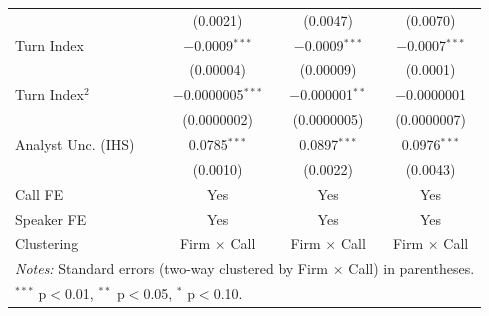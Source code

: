 \documentclass[11pt]{article}
\begin{document}
\begin{table}[htbp]
\begin{tabular}{lccc}
 & (0.0021) & (0.0047) & (0.0070) \\
Turn Index & $-$0.0009$^{***}$ & $-$0.0009$^{***}$ & $-$0.0007$^{***}$ \\
 & (0.00004) & (0.00009) & (0.0001) \\
Turn Index$^2$ & $-$0.0000005$^{***}$ & $-$0.000001$^{**}$ & $-$0.0000001 \\
 & (0.0000002) & (0.0000005) & (0.0000007) \\
Analyst Unc. (IHS) & 0.0785$^{***}$ & 0.0897$^{***}$ & 0.0976$^{***}$ \\
 & (0.0010) & (0.0022) & (0.0043) \\
\midrule
Call FE & Yes & Yes & Yes \\
Speaker FE & Yes & Yes & Yes \\
Clustering & Firm $\times$ Call & Firm $\times$ Call & Firm $\times$ Call \\
\bottomrule
\multicolumn{4}{l}{\parbox{\linewidth}{\footnotesize \textit{Notes:} Standard errors (two-way clustered by Firm $\times$ Call) in parentheses.}} \\
\multicolumn{4}{l}{\parbox{\linewidth}{\footnotesize $^{***}$ p$<$0.01, $^{**}$ p$<$0.05, $^{*}$ p$<$0.10.}} \\
\end{tabular}
\end{table}

\newpage
\end{document}
